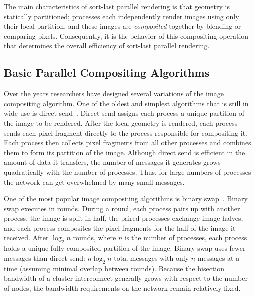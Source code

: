\documentclass{vgtc}                          %
\newcommand*{\lcite}[1]{~\cite{#1}}
\newcommand*{\keyterm}[1]{\emph{#1}}
\begin{document}
The main characteristics of sort-last parallel rendering is that geometry
is statically partitioned; processes each independently render images using
only their local partition, and these images are \keyterm{composited}
together by blending or comparing pixels.  Consequently, it is the behavior
of this compositing operation that determines the overall efficiency of
sort-last parallel rendering.

\subsection{Basic Parallel Compositing Algorithms}
\label{sec:BasicParallelCompositingAlgorithms}

Over the years researchers have designed several variations of the image
compositing algorithm.  One of the oldest and simplest algorithms that is
still in wide use is direct send\lcite{DirectSend1,DirectSend2}.  Direct
send assigns each process a unique partition of the image to be rendered.
After the local geometry is rendered, each process sends each pixel
fragment directly to the process responsible for compositing it.  Each
process then collects pixel fragments from all other processes and combines
them to form its partition of the image.  Although direct send is efficient
in the amount of data it transfers, the number of messages it generates
grows quadratically with the number of processes.  Thus, for large numbers
of processes the network can get overwhelmed by many small messages.

One of the most popular image compositing algorithms is binary
swap\lcite{BinarySwap1,BinarySwap2}.  Binary swap executes in rounds.
During a round, each process pairs up with another process, the image is
split in half, the paired processes exchange image halves, and each process
composites the pixel fragments for the half of the image it received.
After $\log_{2} n$ rounds, where $n$ is the number of processes, each
process holds a unique fully-composited partition of the image.  Binary
swap uses fewer messages than direct send: $n \log_{2} n$ total messages
with only $n$ messages at a time (assuming minimal overlap between
rounds).  Because the bisection bandwidth of a cluster interconnect
generally grows with respect to the number of nodes, the bandwidth
requirements on the network remain relatively fixed.
\end{document}
